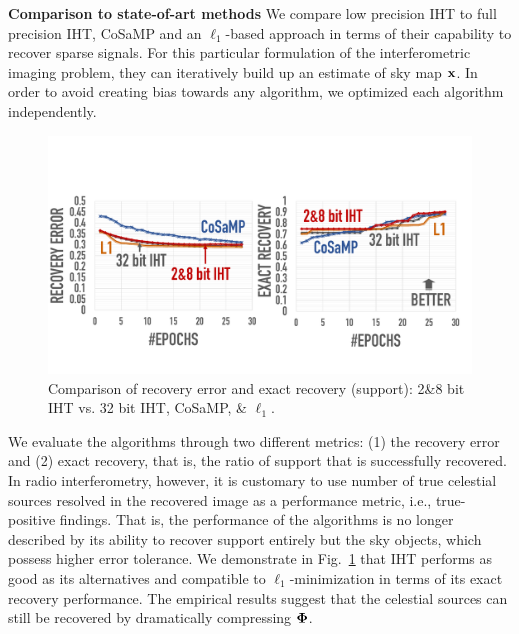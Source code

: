 \documentclass{article}
\begin{document}
{\vspace{-0.3em}
{\bf Comparison to state-of-art methods}
We compare low precision IHT to full precision IHT, CoSaMP and an $\ell_1$-based approach in terms of their capability to recover sparse signals. For this particular formulation of the interferometric imaging problem, they can iteratively build up an estimate of sky map ${\bf x}$. In order to avoid creating bias towards any algorithm, we optimized each algorithm independently.
\begin{figure}[t]
\centering
\includegraphics[width=1.0\columnwidth, angle=0]{figs/comparison.pdf}
\caption{Comparison of recovery error and exact recovery (support): {2\&8 bit} IHT vs. 32 bit IHT, CoSaMP, \& $\ell_1$.}
\label{fig:comparison}
\end{figure}
We evaluate the algorithms through two different metrics: (1) the recovery error and (2) exact recovery, that is, the ratio of support that is successfully recovered. In radio interferometry, however, it is customary to use number of true celestial sources resolved in the recovered image as a performance metric, i.e., true-positive findings. That is, the performance of the algorithms is no longer described by its ability to recover support entirely but the sky objects, which possess higher error tolerance. 
We demonstrate in Fig.~\ref{fig:comparison} that IHT performs as good as its alternatives and compatible to $\ell_1$-minimization in terms of its exact recovery performance. The empirical results suggest that the celestial sources can still be recovered by dramatically compressing ${\bf \Phi}$.
\vspace{-.2em}

}
\end{document}
